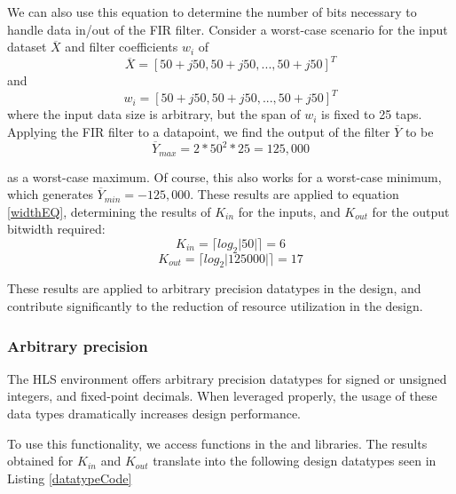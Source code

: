 \documentclass[11pt]{report}
\begin{document}
We can also use this equation to determine the number of bits necessary to handle data in/out of the FIR filter. Consider a worst-case scenario for the input dataset $\overline X$ and filter coefficients $w_i$ of
\begin{equation*}
	\overline X = [50 + j50, 50 + j50,...,50+j50]^T
\end{equation*}
and
\begin{equation*}
	w_i = [50 + j50, 50 + j50,...,50+j50]^T
\end{equation*}
where the input data size is arbitrary, but the span of $w_i$ is fixed to 25 taps. Applying the FIR filter to a datapoint, we find the output of the filter $\overline Y$ to be
\begin{equation*}
	\overline Y_{max} = 2 * 50^2 * 25 = 125,000 
\end{equation*}

as a worst-case maximum. Of course, this also works for a worst-case minimum, which generates  $\overline Y_{min} = -125,000$. These results are applied to equation \ref{widthEQ}, determining the results of $K_{in}$ for the inputs, and $K_{out}$ for the output bitwidth required:
\begin{equation}
	K_{in} = \lceil log_{2}{|50|} \rceil = 6
\end{equation}
\begin{equation}
	K_{out} = \lceil log_{2}{|125000|} \rceil = 17
\end{equation}

These results are applied to arbitrary precision datatypes in the design, and contribute significantly to the reduction of resource utilization in the design.

\subsubsection{Arbitrary precision}

The HLS environment offers arbitrary precision datatypes for signed or unsigned integers, and fixed-point decimals. When leveraged properly, the usage of these data types dramatically increases design performance. 

To use this functionality, we access functions in the  and  libraries. The results obtained for $K_{in}$ and $K_{out}$ translate into the following design datatypes seen in Listing \ref{datatypeCode}

\begin{singlespace}
    
\end{singlespace}
\end{document}

